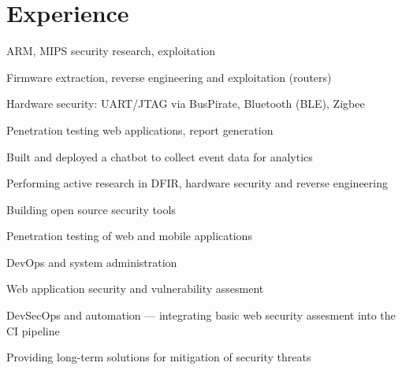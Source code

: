\documentclass[]{resume-openfont}
\begin{document}
\hfill
\begin{minipage}[t]{0.66\textwidth} 


\section{Experience}
\vspace{\topsep} %
\begin{tightemize}
\item ARM, MIPS security research, exploitation
\item Firmware extraction, reverse engineering and exploitation (routers)
\item Hardware security: UART/JTAG via BusPirate, Bluetooth (BLE), Zigbee
\end{tightemize}
\sectionsep

\begin{tightemize}
\item Penetration testing web applications, report generation
\item Built and deployed a chatbot to collect event data for analytics
\end{tightemize}
\sectionsep

\begin{tightemize}
\item Performing active research in DFIR, hardware security and reverse engineering
\item Building open source security tools	
\end{tightemize}
\sectionsep

\begin{tightemize}
\item Penetration testing of web and mobile applications
\item DevOps and system administration
\end{tightemize}
\sectionsep

\begin{tightemize}
\item Web application security and vulnerability assesment
\item DevSecOps and automation — integrating basic web security assesment into the CI pipeline
\item Providing long-term solutions for mitigation of security threats
\end{tightemize}
\sectionsep


\end{minipage}
\end{document}
